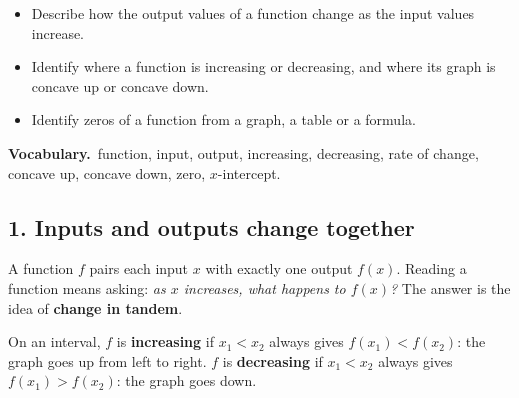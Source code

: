 \newcommand{\goals}[1]{\begin{keyidea}[Learning goals]\begin{itemize}#1\end{itemize}\end{keyidea}}
\newcommand{\vocab}[1]{\par\textsf{\bfseries\small\color{apnavy}Vocabulary.}\ #1\par}
\newcommand{\qcanswers}[1]{\par\smallskip{\footnotesize\color{apgrey}\textsf{\bfseries Answers.} #1}}

\goals{\item Describe how the output values of a function change as the input values increase.
\item Identify where a function is increasing or decreasing, and where its graph is concave up or concave down.
\item Identify zeros of a function from a graph, a table or a formula.}
\vocab{function, input, output, increasing, decreasing, rate of change, concave up, concave down, zero, $x$-intercept.}

\subsection*{1. Inputs and outputs change together}
A function $f$ pairs each input $x$ with exactly one output $f(x)$. Reading a function means asking: \emph{as $x$ increases, what happens to $f(x)$?} The answer is the idea of \textbf{change in tandem}.

\begin{keyidea}
On an interval, $f$ is \textbf{increasing} if $x_1<x_2$ always gives $f(x_1)<f(x_2)$: the graph goes up from left to right. $f$ is \textbf{decreasing} if $x_1<x_2$ always gives $f(x_1)>f(x_2)$: the graph goes down.
\end{keyidea}

